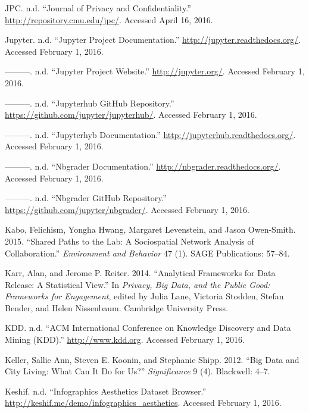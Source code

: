 \documentclass[]{krantz}
\begin{document}
\hypertarget{ref-JPC}{}
JPC. n.d. ``Journal of Privacy and Confidentiality.''
\url{http://repository.cmu.edu/jpc/}. Accessed April 16, 2016.

\hypertarget{ref-juypterdoc}{}
Jupyter. n.d. ``Jupyter Project Documentation.''
\url{http://jupyter.readthedocs.org/}. Accessed February 1, 2016.

\hypertarget{ref-juypter}{}
---------. n.d. ``Jupyter Project Website.'' \url{http://jupyter.org/}.
Accessed February 1, 2016.

\hypertarget{ref-juypterhub}{}
---------. n.d. ``Jupyterhub GitHub Repository.''
\url{https://github.com/jupyter/jupyterhub/}. Accessed February 1, 2016.

\hypertarget{ref-juypterhubdoc}{}
---------. n.d. ``Jupyterhyb Documentation.''
\url{http://jupyterhub.readthedocs.org/}. Accessed February 1, 2016.

\hypertarget{ref-nbgraderdoc}{}
---------. n.d. ``Nbgrader Documentation.''
\url{http://nbgrader.readthedocs.org/}. Accessed February 1, 2016.

\hypertarget{ref-nbgrader}{}
---------. n.d. ``Nbgrader GitHub Repository.''
\url{https://github.com/jupyter/nbgrader/}. Accessed February 1, 2016.

\hypertarget{ref-kabo2015shared}{}
Kabo, Felichism, Yongha Hwang, Margaret Levenstein, and Jason
Owen-Smith. 2015. ``Shared Paths to the Lab: A Sociospatial Network
Analysis of Collaboration.'' \emph{Environment and Behavior} 47 (1).
SAGE Publications: 57--84.

\hypertarget{ref-karr2014analytical}{}
Karr, Alan, and Jerome P. Reiter. 2014. ``Analytical Frameworks for Data
Release: A Statistical View.'' In \emph{Privacy, Big Data, and the
Public Good: Frameworks for Engagement}, edited by Julia Lane, Victoria
Stodden, Stefan Bender, and Helen Nissenbaum. Cambridge University
Press.

\hypertarget{ref-kdd}{}
KDD. n.d. ``ACM International Conference on Knowledge Discovery and Data
Mining (KDD).'' \url{http://www.kdd.org}. Accessed February 1, 2016.

\hypertarget{ref-keller2012big}{}
Keller, Sallie Ann, Steven E. Koonin, and Stephanie Shipp. 2012. ``Big
Data and City Living: What Can It Do for Us?'' \emph{Significance} 9
(4). Blackwell: 4--7.

\hypertarget{ref-harrisonweb}{}
Keshif. n.d. ``Infographics Aesthetics Dataset Browser.''
\url{http://keshif.me/demo/infographics_aesthetics}. Accessed February
1, 2016.
\end{document}
